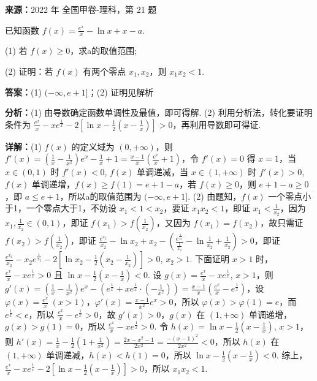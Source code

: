 \begin{question}[points=12]
\textbf{来源：}2022 年 全国甲卷-理科，第 21 题\par
已知函数 $f(x)=\frac{e^x}{x}-\ln x+x-a$.

(1) 若 $f(x)\geq 0$，求a的取值范围;

(2) 证明：若 $f(x)$ 有两个零点 $x_1, x_2$，则 $x_1x_2<1$.
\begin{solution}
\textbf{答案：}(1) $(-\infty, e+1]$；(2) 证明见解析

\textbf{分析：}(1) 由导数确定函数单调性及最值，即可得解. (2) 利用分析法，转化要证明条件为 $\frac{e^x}{x}-xe^{\frac{1}{x}}-2\left[\ln x-\frac{1}{2}\left(x-\frac{1}{x}\right)\right]>0$，再利用导数即可得证.

\textbf{详解：}(1) $f(x)$ 的定义域为 $(0,+\infty)$，则 $f'(x)=\left(\frac{1}{x}-\frac{1}{x^2}\right)e^x-\frac{1}{x}+1=\frac{x-1}{x}\left(\frac{e^x}{x}+1\right)$，令 $f'(x)=0$ 得 $x=1$，当 $x\in(0,1)$ 时 $f'(x)<0$, $f(x)$ 单调递减，当 $x\in(1,+\infty)$ 时 $f'(x)>0$, $f(x)$ 单调递增，$f(x)\geq f(1)=e+1-a$，若 $f(x)\geq0$，则 $e+1-a\geq0$，即 $a\leq e+1$，所以a的取值范围为 $(-\infty, e+1]$.
(2) 由题知，$f(x)$ 一个零点小于1，一个零点大于1，不妨设 $x_1<1<x_2$，要证 $x_1x_2<1$，即证 $x_1<\frac{1}{x_2}$，因为 $x_1,\frac{1}{x_2}\in(0,1)$，即证 $f(x_1)>f\left(\frac{1}{x_2}\right)$，又因为 $f(x_1)=f(x_2)$，故只需证 $f(x_2)>f\left(\frac{1}{x_2}\right)$，即证 $\frac{e^{x_2}}{x_2}-\ln x_2+x_2-\left(\frac{e^{\frac{1}{x_2}}}{\frac{1}{x_2}}-\ln\frac{1}{x_2}+\frac{1}{x_2}\right)>0$，即证 $\frac{e^{x_2}}{x_2}-x_2 e^{\frac{1}{x_2}}-2\left[\ln x_2-\frac{1}{2}\left(x_2-\frac{1}{x_2}\right)\right]>0$, $x_2>1$. 下面证明 $x>1$ 时，$\frac{e^x}{x}-xe^{\frac{1}{x}}>0$ 且 $\ln x-\frac{1}{2}\left(x-\frac{1}{x}\right)<0$. 设 $g(x)=\frac{e^x}{x}-xe^{\frac{1}{x}}$, $x>1$，则 $g'(x)=\left(\frac{1}{x}-\frac{1}{x^2}\right)e^x-\left(e^{\frac{1}{x}}+xe^{\frac{1}{x}}\cdot(-\frac{1}{x^2})\right)=\frac{x-1}{x}\left(\frac{e^x}{x}-e^{\frac{1}{x}}\right)$，设 $\varphi(x)=\frac{e^x}{x}\ (x>1)$，$\varphi'(x)=\frac{x-1}{x^2}e^x>0$，所以 $\varphi(x)>\varphi(1)=e$，而 $e^{\frac{1}{x}}<e$，所以 $\frac{e^x}{x}-e^{\frac{1}{x}}>0$，故 $g'(x)>0$，$g(x)$ 在 $(1,+\infty)$ 单调递增，$g(x)>g(1)=0$，所以 $\frac{e^x}{x}-xe^{\frac{1}{x}}>0$. 令 $h(x)=\ln x-\frac{1}{2}\left(x-\frac{1}{x}\right)$, $x>1$，则 $h'(x)=\frac{1}{x}-\frac{1}{2}\left(1+\frac{1}{x^2}\right)=\frac{2x-x^2-1}{2x^2}=\frac{-(x-1)^2}{2x^2}<0$，所以 $h(x)$ 在 $(1,+\infty)$ 单调递减，$h(x)<h(1)=0$，所以 $\ln x-\frac{1}{2}\left(x-\frac{1}{x}\right)<0$. 综上，$\frac{e^x}{x}-xe^{\frac{1}{x}}-2\left[\ln x-\frac{1}{2}\left(x-\frac{1}{x}\right)\right]>0$，所以 $x_1x_2<1$.
\end{solution}
\end{question}

